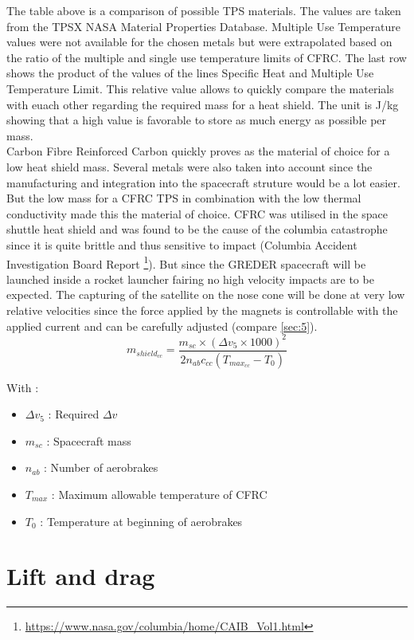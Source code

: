 The table above is a comparison of possible TPS materials. The values are taken from the TPSX NASA Material Properties Database. Multiple Use Temperature values were not available for the chosen metals but were extrapolated based on the ratio of the multiple and single use temperature limits of CFRC. The last row shows the product of the values of the lines Specific Heat and Multiple Use Temperature Limit. This relative value allows to quickly compare the materials with euach other regarding the required mass for a heat shield. The unit is J/kg showing that a high value is favorable to store as much energy as possible per mass.\\

Carbon Fibre Reinforced Carbon quickly proves as the material of choice for a low heat shield mass. Several metals were also taken into account since the manufacturing and integration into the spacecraft struture would be a lot easier. But the low mass for a CFRC TPS in combination with the low thermal conductivity made this the material of choice. CFRC was utilised in the space shuttle heat shield and was found to be the cause of the columbia catastrophe since it is quite brittle and thus sensitive to impact (Columbia Accident Investigation Board Report \footnote{\url{https://www.nasa.gov/columbia/home/CAIB\_Vol1.html}}). But since the GREDER spacecraft will be launched inside a rocket launcher fairing no high velocity impacts are to be expected. The capturing of the satellite on the nose cone will be done at very low relative velocities since the force applied by the magnets is controllable with the applied current and can be carefully adjusted (compare \autoref{sec:5}).
\begin{equation}
	m_{shield_{cc}}= \frac{m_{sc} \times (\Delta v_5\times 1000)^2}{2n_{ab}c_{cc}(T_{max_{cc}}-T_0)}
\end{equation}

With :
\begin{itemize}
	\itemsep0em 
	\item $\Delta v_5$ : Required $\Delta v$
	\item $m_{sc}$ : Spacecraft mass
	\item $n_{ab}$ : Number of aerobrakes
	\item $T_{max}$ : Maximum allowable temperature of CFRC
	\item $T_0$ : Temperature at beginning of aerobrakes
\end{itemize}

\section{Lift and drag}

